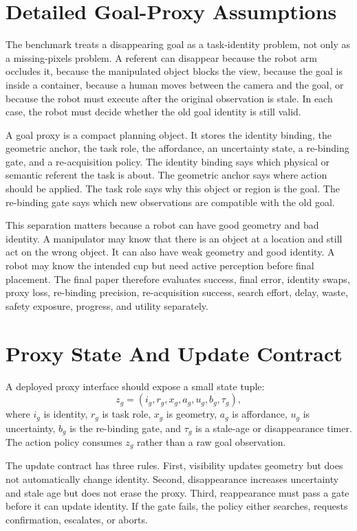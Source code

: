 \section{Detailed Goal-Proxy Assumptions}

The benchmark treats a disappearing goal as a task-identity problem, not only as a missing-pixels problem. A referent can disappear because the robot arm occludes it, because the manipulated object blocks the view, because the goal is inside a container, because a human moves between the camera and the goal, or because the robot must execute after the original observation is stale. In each case, the robot must decide whether the old goal identity is still valid.

A goal proxy is a compact planning object. It stores the identity binding, the geometric anchor, the task role, the affordance, an uncertainty state, a re-binding gate, and a re-acquisition policy. The identity binding says which physical or semantic referent the task is about. The geometric anchor says where action should be applied. The task role says why this object or region is the goal. The re-binding gate says which new observations are compatible with the old goal.

This separation matters because a robot can have good geometry and bad identity. A manipulator may know that there is an object at a location and still act on the wrong object. It can also have weak geometry and good identity. A robot may know the intended cup but need active perception before final placement. The final paper therefore evaluates success, final error, identity swaps, proxy loss, re-binding precision, re-acquisition success, search effort, delay, waste, safety exposure, progress, and utility separately.

\section{Proxy State And Update Contract}

A deployed proxy interface should expose a small state tuple:
\[
z_g = (i_g, r_g, x_g, a_g, u_g, b_g, \tau_g),
\]
where $i_g$ is identity, $r_g$ is task role, $x_g$ is geometry, $a_g$ is affordance, $u_g$ is uncertainty, $b_g$ is the re-binding gate, and $\tau_g$ is a stale-age or disappearance timer. The action policy consumes $z_g$ rather than a raw goal observation.

The update contract has three rules. First, visibility updates geometry but does not automatically change identity. Second, disappearance increases uncertainty and stale age but does not erase the proxy. Third, reappearance must pass a gate before it can update identity. If the gate fails, the policy either searches, requests confirmation, escalates, or aborts.

